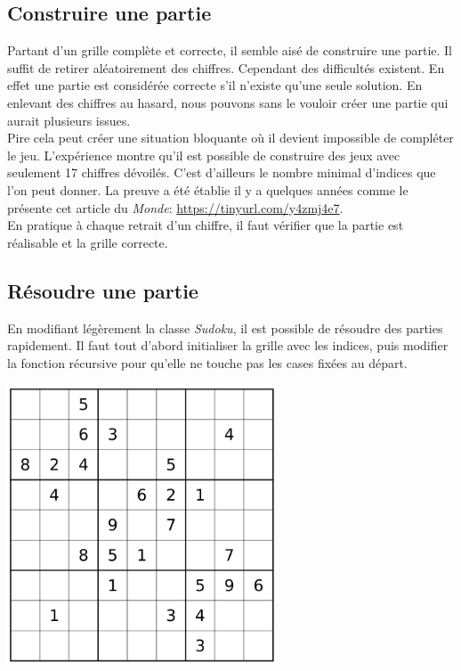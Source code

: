 \documentclass[a4paper,11pt]{article}
\begin{document}
\begin{Form}
\subsection{Construire une partie}
Partant d'un grille complète et correcte, il semble aisé de construire une partie. Il suffit de retirer aléatoirement des chiffres. Cependant des difficultés existent. En effet une partie est considérée correcte s'il n'existe qu'une seule solution. En enlevant des chiffres au hasard, nous pouvons sans le vouloir créer une partie qui aurait plusieurs issues.\\
Pire cela peut créer une situation bloquante où il devient impossible de compléter le jeu. L'expérience montre qu'il est possible de construire des jeux avec seulement 17 chiffres dévoilés. C'est d'ailleurs le nombre minimal d'indices que l'on peut donner. La preuve a été établie il y a quelques années comme le présente cet article du \emph{Monde}: \url{https://tinyurl.com/y4zmj4e7}.\\
En pratique à chaque retrait d'un chiffre, il faut vérifier que la partie est réalisable et la grille correcte.
\subsection{Résoudre une partie}
En modifiant légèrement la classe \emph{Sudoku}, il est possible de résoudre des parties rapidement. Il faut tout d'abord initialiser la grille avec les indices, puis modifier la fonction récursive pour qu'elle ne touche pas les cases fixées au départ.
\begin{center}
\centering
\includegraphics[width=8cm]{ressources/partie.png}
\label{partie}
\end{center}
\end{Form}
\end{document}
